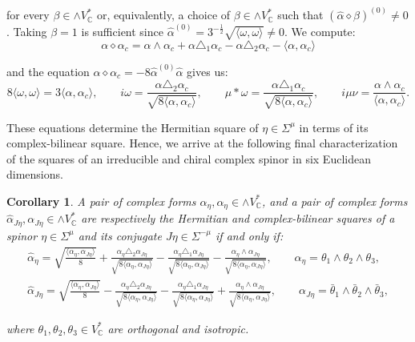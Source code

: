 \documentclass[10pt,a4paper,twoside,reqno]{amsart}
\theoremstyle{plain}
\newtheorem{cor}[thm]{Corollary}
\theoremstyle{definition}
\theoremstyle{remark}
\def\C{\mathbb{C}}
\newcommand{\escal}[1]{\langle#1\rangle}
\begin{document}
\noindent
for every $\beta\in \wedge V^{\ast}_{\C}$ or, equivalently, a choice of $\beta\in \wedge V^{\ast}_{\C}$ such that $(\widehat{\alpha} \diamond \beta)^{(0)}  \neq 0$. Taking $\beta=1$ is sufficient since $\widehat{\alpha}^{(0)}=3^{-\frac{1}{2}}\sqrt{\escal{\omega,\omega}}\neq0$. We compute:
\begin{equation*}
\alpha\diamond\alpha_c=\alpha\wedge\alpha_c+\alpha\triangle_1\alpha_c-\alpha\triangle_2\alpha_c-\escal{\alpha,\alpha_c}
\end{equation*}

\noindent
and the equation $\alpha\diamond\alpha_c=-8\widehat{\alpha}^{(0)}\widehat{\alpha}$ gives us:
\begin{equation*}
8\escal{\omega,\omega}=3\escal{\alpha,\alpha_c},\qquad i\omega=\frac{\alpha\triangle_2\alpha_c}{\sqrt{8\escal{\alpha,\alpha_c}}},\qquad \mu*\omega=\frac{\alpha\triangle_1\alpha_c}{\sqrt{8\escal{\alpha,\alpha_c}}},\qquad i\mu\nu=\frac{\alpha\wedge\alpha_c}{\escal{\alpha,\alpha_c}}.
\end{equation*}

These equations determine the Hermitian square of $\eta\in\Sigma^\mu$ in terms of its complex-bilinear square. Hence, we arrive at the following final characterization of the squares of an irreducible and chiral complex spinor in six Euclidean dimensions.

\begin{cor}
A pair of complex forms $\widehat{\alpha}_\eta, \alpha_\eta \in \wedge V^{\ast}_{\mathbb{C}}$, and a pair of complex forms $\widehat{\alpha}_{J\eta}, \alpha_{J\eta} \in \wedge V^{\ast}_{\mathbb{C}}$ are respectively the Hermitian and complex-bilinear squares of a spinor $\eta\in\Sigma^\mu$ and its conjugate $J\eta\in\Sigma^{-\mu}$ if and only if:
\begin{gather*}
\widehat{\alpha}_\eta=\sqrt{\frac{\escal{\alpha_\eta,\alpha_{J\eta}}}{8}}+\frac{\alpha_\eta\triangle_2\alpha_{J\eta}}{\sqrt{8\escal{\alpha_\eta,\alpha_{J\eta}}}}-\frac{\alpha_\eta\triangle_1\alpha_{J\eta}}{\sqrt{8\escal{\alpha_\eta,\alpha_{J\eta}}}}-\frac{\alpha_\eta\wedge\alpha_{J\eta}}{\sqrt{8\escal{\alpha_\eta,\alpha_{J\eta}}}},\qquad \alpha_\eta=\theta_1\wedge\theta_2\wedge\theta_3,\\
\widehat{\alpha}_{J\eta}=\sqrt{\frac{\escal{\alpha_\eta,\alpha_{J\eta}}}{8}}-\frac{\alpha_\eta\triangle_2\alpha_{J\eta}}{\sqrt{8\escal{\alpha_\eta,\alpha_{J\eta}}}}-\frac{\alpha_\eta\triangle_1\alpha_{J\eta}}{\sqrt{8\escal{\alpha_\eta,\alpha_{J\eta}}}}+\frac{\alpha_\eta\wedge\alpha_{J\eta}}{\sqrt{8\escal{\alpha_\eta,\alpha_{J\eta}}}},\qquad \alpha_{J\eta}=\bar\theta_1\wedge\bar\theta_2\wedge\bar\theta_3,
\end{gather*}

\noindent
where $\theta_1,\theta_2,\theta_3\in V^*_\C$ are orthogonal and isotropic.
\end{cor}
\end{document}
